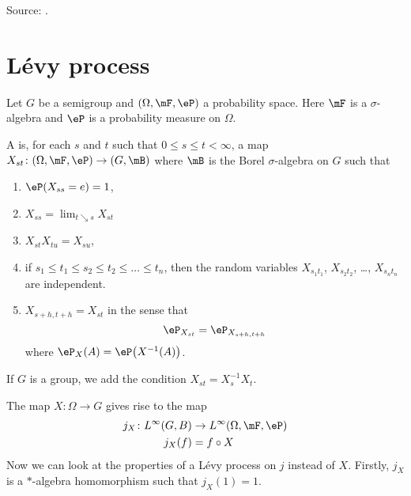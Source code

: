 Source: \cite{UweLevy}.

\section{Lévy process}

Let $G$ be a semigroup and $(\Omega,\mF,\eP)$ a probability space. Here $\mF$ is a $\sigma$-algebra and $\eP$ is a probability measure on $\Omega$.
\begin{definition}
	A  is, for each $s$ and $t$ such that $0\leq s\leq t<\infty$, a map $X_{st}\colon (\Omega,\mF,\eP)\to (G,\mB)$ where $\mB$ is the Borel $\sigma$-algebra on $G$ such that
	\begin{enumerate}
		\item
		      $\eP(X_{ss}=e)=1$,
		\item
		      $X_{ss}=\lim_{t\searrow s}X_{st}$
		\item
		      $X_{st}X_{tu}=X_{su}$,
		\item
		      if $s_1\leq t_1\leq s_2\leq t_2\leq \ldots\leq t_n$, then the random variables $X_{s_1t_1}$, $X_{s_2t_2}$, \ldots, $X_{s_nt_n}$ are independent.
		\item
		      $X_{s+h,t+h}=X_{st}$ in the sense that
		      \begin{equation}
			      \eP_{X_{st}}=\eP_{X_{s+h,t+h}}
		      \end{equation}
		      where $\eP_X(A)=\eP\big( X^{-1}(A) \big)$.
	\end{enumerate}
	If $G$ is a group, we add the condition $X_{st}=X_s^{-1}X_t$.
\end{definition}

The map $X\colon \Omega\to G$ gives rise to the map
\begin{equation}
	\begin{aligned}
		j_X\colon L^{\infty}(G,B) & \to L^{\infty}(\Omega,\mF,\eP) \\
		j_X(f)                    & =f\circ X
	\end{aligned}
\end{equation}
Now we can look at the properties of a Lévy process on $j$ instead of $X$. Firstly, $j_X$ is a $*$-algebra homomorphism such that $j_X(1)=1$.

